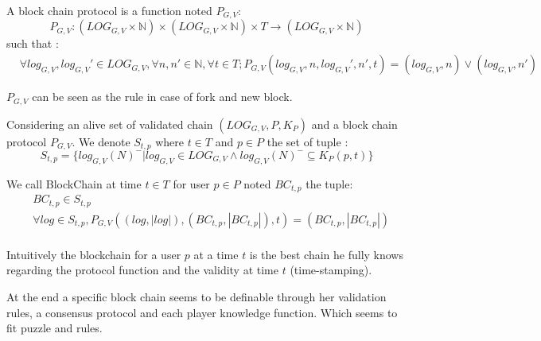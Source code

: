 \begin{mydef}
	A block chain protocol is a function noted $P_{G,V}$:
	$$P_{G,V} : (LOG_{G,V}\times \mathbb{N})  \times (LOG_{G,V}\times \mathbb{N}) \times T \rightarrow (LOG_{G,V}\times \mathbb{N}) $$
	such that :
		\begin{align*}
		&\forall log_{G,V},log_{G,V}' \in LOG_{G,V}, \forall n,n' \in \mathbb{N} , \forall t \in T; P_{G,V}(log_{G,V},n,log_{G,V}',n',t) = (log_{G,V},n) \lor (log_{G,V},n')		\end{align*}
\end{mydef}
\begin{myrem}
	$P_{G,V}$ can be seen as the rule in case of fork and new block. 
\end{myrem}

\begin{mydef}
	Considering an alive set of validated chain $(LOG_{G,V},P,K_P)$ and a block chain protocol $P_{G,V}$. We denote $S_{t,p}$ where $t\in T$ and $p\in P$ the set of tuple :
	$$ S_{t,p} = \{log_{G,V}(N)^- | log_{G,V} \in LOG_{G,V} \land log_{G,V}(N)^- \subseteq K_P(p,t)\} $$
	
	We call BlockChain at time $t\in T$ for user $p \in P$ noted $BC_{t,p}$ the tuple:
	\begin{align*}
	&BC_{t,p} \in S_{t,p} \\
	& \forall log \in S_{t,p}, P_{G,V}((log,|log|),(BC_{t,p},|BC_{t,p}|),t) = (BC_{t,p},|BC_{t,p}|) \\
	\end{align*}
	
\end{mydef}
\begin{myrem}
	Intuitively the blockchain for a user $p$ at a time $t$ is the best chain he fully knows regarding the protocol function and the validity at time $t$ (time-stamping).
\end{myrem}

At the end a specific block chain seems to be definable through her validation rules, a consensus protocol and each player knowledge function. Which seems to fit puzzle and rules.
